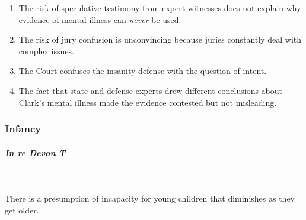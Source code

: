 \begin{enumerate}
\begin{enumerate}
        whether it ``made him unaware that he was shooting a police 
        officer.''\footnote{Casebook p. 668.}
        \item The risk of speculative testimony from expert witnesses does not 
        explain why evidence of mental illness can \emph{never} be used.
        \item The risk of jury confusion is unconvincing because juries 
        constantly deal with complex issues.
        \item The Court confuses the insanity defense with the question of 
        intent.
        \item The fact that state and defense experts drew different 
        conclusions about Clark's mental illness made the evidence contested 
        but not misleading.
    \end{enumerate}
\end{enumerate}

\subsubsection{Infancy}

\paragraph{\emph{In re Devon T}}
~\\\\
There is a presumption of incapacity for young children that diminishes as 
they get older.

